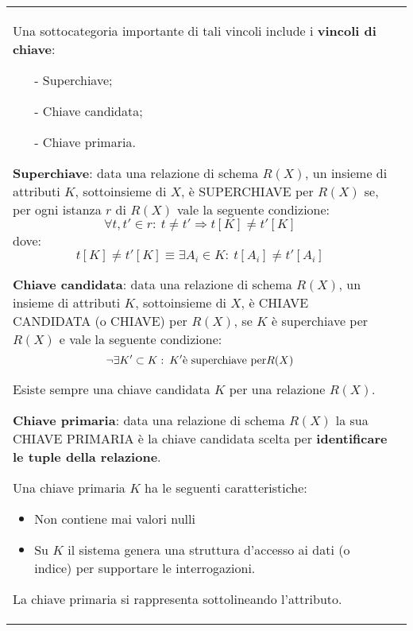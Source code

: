 \documentclass[a4paper, 10pt]{report}
\begin{document}
\begin{longtable}{| p{} | p{} |}
			Una sottocategoria importante di tali vincoli include i
			\textbf{vincoli di chiave}:
			\begin{itemize}
				\item[-] Superchiave;
				\item[-] Chiave candidata;
				\item[-] Chiave primaria.
			\end{itemize}

\textbf{Superchiave}: data una relazione di schema $R(X)$, un insieme di attributi $K$, sottoinsieme di $X$, è SUPERCHIAVE per
				$R(X)$ se, per ogni istanza $r$ di $R(X)$ vale la seguente
				condizione:
				\[
					\forall t, t' \in r : 
					\: t \neq t' \Rightarrow t[K] \neq t' [K]
				\]
				dove:
				\[
					t[K] \neq t' [K] \equiv \exists A_i \in K : \:
					 t[A_i] \neq t' [A_i]
				\]
				
\textbf{Chiave candidata}: data una relazione di schema $R(X)$, un insieme di
				attributi $K$, sottoinsieme di $X$, è CHIAVE CANDIDATA
				(o CHIAVE) per $R(X)$, se $K$ è superchiave per $R(X)$ e
				vale la seguente condizione:
				\[
					\neg \exists K' \subset K : \: K' 
					\textup{è superchiave per} R(X)
				\]
			
				Esiste sempre una chiave candidata $K$ per una
				relazione $R(X)$.	
	
\medskip	
				
\textbf{Chiave primaria}: data una relazione di schema $R(X)$ la sua CHIAVE
				PRIMARIA è la chiave candidata scelta per \textbf{identificare
				le tuple della relazione}.
				
				Una chiave primaria $K$ ha le seguenti caratteristiche:
				\begin{itemize}
					\item Non contiene mai valori nulli
					\item Su $K$ il sistema genera una struttura d'accesso ai dati
					(o indice) per supportare le interrogazioni.
				\end{itemize}
				
				La chiave primaria si rappresenta sottolineando l'attributo.							
\end{longtable}
\newpage
\end{document}
